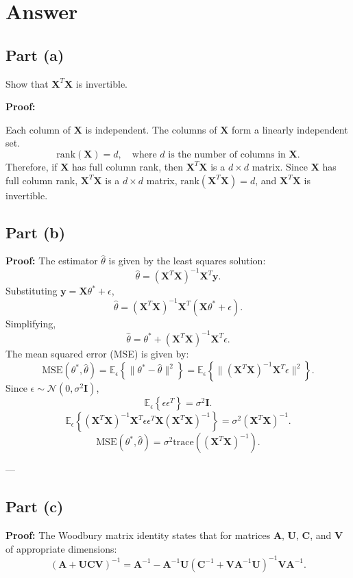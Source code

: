 \documentclass[11pt]{article}
\begin{document}
	\section*{Answer}
	\subsection*{Part (a)}
	Show that $\mathbf{X}^T \mathbf{X}$ is invertible.
	
	\textbf{Proof:}

	Each column of $\mathbf{X}$ is independent. The columns of $\mathbf{X}$ form a linearly independent set.
	\[
	\text{rank}(\mathbf{X}) = d, \quad \text{where } d \text{ is the number of columns in } \mathbf{X}.
	\]
	Therefore, if $\mathbf{X}$ has full column rank, then $\mathbf{X}^T \mathbf{X}$ is a $d \times d$ matrix. Since $\mathbf{X}$ has full column rank, $\mathbf{X}^T \mathbf{X}$ is a $d \times d$ matrix, $\text{rank}(\mathbf{X}^T \mathbf{X}) = d$, and $\mathbf{X}^T \mathbf{X}$ is invertible.

	
	\subsection*{Part (b)}
	\textbf{Proof:}
	The estimator $\hat{\theta}$ is given by the least squares solution:
	   \[
	   \hat{\theta} = (\mathbf{X}^T \mathbf{X})^{-1} \mathbf{X}^T \mathbf{y}.
	   \]
	   Substituting $\mathbf{y} = \mathbf{X} \theta^* + \epsilon$, 
	   \[
	   \hat{\theta} = (\mathbf{X}^T \mathbf{X})^{-1} \mathbf{X}^T (\mathbf{X} \theta^* + \epsilon).
	   \]
	Simplifying,
	   \[
	   \hat{\theta} = \theta^* + (\mathbf{X}^T \mathbf{X})^{-1} \mathbf{X}^T \epsilon.
	   \]
	The mean squared error (MSE) is given by:
	   \[
	   \text{MSE}(\theta^*, \hat{\theta}) = \mathbb{E}_\epsilon \left\{ \|\theta^* - \hat{\theta}\|^2 \right\} = \mathbb{E}_\epsilon \left\{ \|(\mathbf{X}^T \mathbf{X})^{-1} \mathbf{X}^T \epsilon\|^2 \right\}.
	   \]
	Since $\epsilon \sim \mathcal{N}(0, \sigma^2 \mathbf{I})$, 
	   \[
	   \mathbb{E}_\epsilon \left\{ \epsilon \epsilon^T \right\} = \sigma^2 \mathbf{I}.
	   \]
	   \[
	   \mathbb{E}_\epsilon \left\{ (\mathbf{X}^T \mathbf{X})^{-1} \mathbf{X}^T \epsilon \epsilon^T \mathbf{X} (\mathbf{X}^T \mathbf{X})^{-1} \right\} = \sigma^2 (\mathbf{X}^T \mathbf{X})^{-1}.
	   \]
	   \[
	   \text{MSE}(\theta^*, \hat{\theta}) = \sigma^2 \text{trace}((\mathbf{X}^T \mathbf{X})^{-1}).
	   \]
	
	---
	
	\subsection*{Part (c)}
	\textbf{Proof:}
	The Woodbury matrix identity states that for matrices $\mathbf{A}$, $\mathbf{U}$, $\mathbf{C}$, and $\mathbf{V}$ of appropriate dimensions:
	   \[
	   (\mathbf{A} + \mathbf{U} \mathbf{C} \mathbf{V})^{-1} = \mathbf{A}^{-1} - \mathbf{A}^{-1} \mathbf{U} (\mathbf{C}^{-1} + \mathbf{V} \mathbf{A}^{-1} \mathbf{U})^{-1} \mathbf{V} \mathbf{A}^{-1}.
	   \]
\end{document}
